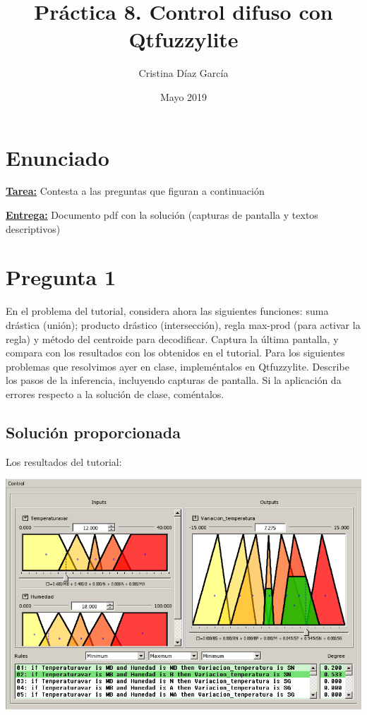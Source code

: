 \documentclass{article}
\title{Práctica 8. Control difuso con Qtfuzzylite}
\author{Cristina Díaz García}
\date{Mayo 2019}
\begin{document}

\begin{titlingpage}
\maketitle
\end{titlingpage}

\newpage

\tableofcontents

\newpage

\section{Enunciado}

\textbf{\underline{Tarea:}} Contesta a las preguntas que figuran a continuación

\textbf{\underline{Entrega:}} Documento pdf con la solución (capturas de pantalla y textos descriptivos)

\section{Pregunta 1}

En el problema del tutorial, considera ahora las siguientes funciones: suma drástica (unión); producto
drástico (intersección), regla max-prod (para activar la regla) y método del centroide para decodificar. Captura la
última pantalla, y compara con los resultados con los obtenidos en el tutorial.
Para los siguientes problemas que resolvimos ayer en clase, impleméntalos en Qtfuzzylite. Describe los pasos de la
inferencia, incluyendo capturas de pantalla. Si la aplicación da errores respecto a la solución de clase, coméntalos.

\subsection{Solución proporcionada}

Los resultados del tutorial:

\begin{center}
\includegraphics[scale=0.5]{images/res1.png}
\end{center}
\end{document}
